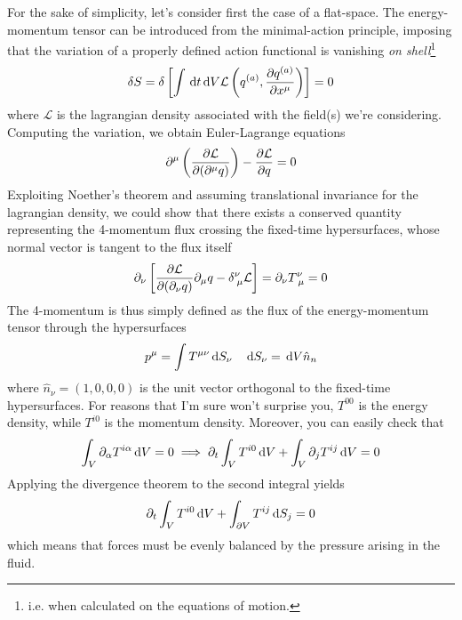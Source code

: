 For the sake of simplicity, let's consider first the case of a flat-space. The energy-momentum tensor can be introduced from the minimal-action principle, imposing that the variation of a properly defined action functional is vanishing \emph{on shell}\footnote{i.e. when calculated on the equations of motion.}
\begin{equation}
    \delta S = \delta \left[\int \,\text{d}t\,\text{d}V\mathcal{L}\left(q^{(a)}, \frac{\partial q^{(a)}}{\partial x^{\mu}}\right)\right] = 0
\end{equation}
where $\mathcal{L}$ is the lagrangian density associated with the field(s) we're considering. Computing the variation, we obtain Euler-Lagrange equations
\begin{equation}
    \partial^{\mu}\left(\frac{\partial \mathcal{L}}{\partial (\partial^{\mu}q)}\right) - \frac{\partial \mathcal{L}}{\partial q} = 0
    \label{eq:EL-eq}
\end{equation}
Exploiting Noether's theorem and assuming translational invariance for the lagrangian density, we could show that there exists a conserved quantity representing the 4-momentum flux crossing the fixed-time hypersurfaces, whose normal vector is tangent to the flux itself
\begin{equation}
    \partial_{\nu}\left[\frac{\partial \mathcal{L}}{\partial (\partial_{\nu}q)}\partial_{\mu}q - \delta^{\nu}_{\;\mu}\mathcal{L}\right] = \partial_{\nu}T^{\nu}_{\;\mu} = 0
\end{equation}
The 4-momentum is thus simply defined as the flux of the energy-momentum tensor through the hypersurfaces
\begin{equation}
    p^{\mu} = \int T^{\mu\nu}\,\text{d}S_{\nu} \quad \,\text{d}S_{\nu} = \,\text{d}V\hat{n}_{n}
\end{equation}
where $\hat{n}_{\nu} = (1,0,0,0)$ is the unit vector orthogonal to the fixed-time hypersurfaces. For reasons that I'm sure won't surprise you, $T^{00}$ is the energy density, while $T^{i0}$ is the momentum density. Moreover, you can easily check that 
\begin{equation}
    \int_{V} \partial_{\alpha}T^{i\alpha}\,\text{d}V = 0 \implies \partial_{t}\int_{V} T^{i0}\,\text{d}V + \int_{V} \partial_{j}T^{ij}\,\text{d}V = 0
\end{equation}
Applying the divergence theorem to the second integral yields
\begin{equation}
    \partial_{t}\int_{V} T^{i0}\,\text{d}V + \int_{\partial V} T^{ij}\,\text{d}S_{j} = 0
\end{equation}
which means that forces must be evenly balanced by the pressure arising in the fluid.
